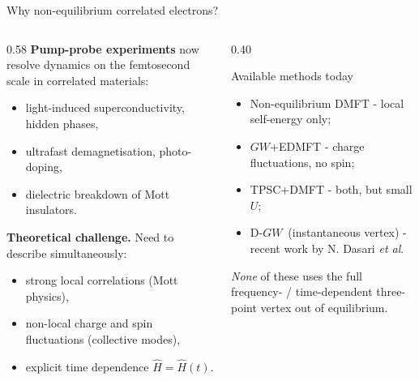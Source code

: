\documentclass[10pt,aspectratio=169]{beamer}
\newcommand{\dgw}{D\nobreakdash-$GW$}
\begin{document}
\begin{frame}{Why non-equilibrium correlated electrons?}
  \begin{columns}[T,onlytextwidth]
    \begin{column}{0.58\textwidth}
      \textbf{Pump-probe experiments} now resolve dynamics on the
      femtosecond scale in correlated materials:
      \begin{itemize}
        \item light-induced superconductivity, hidden phases,
        \item ultrafast demagnetisation, photo-doping,
        \item dielectric breakdown of Mott insulators.
      \end{itemize}

      \vspace{0.5em}
      \textbf{Theoretical challenge.} Need to describe simultaneously:
      \begin{itemize}
        \item strong local correlations (Mott physics),
        \item non-local charge and spin fluctuations (collective modes),
        \item explicit time dependence $\hat H = \hat H(t)$.
      \end{itemize}
    \end{column}
    \begin{column}{0.40\textwidth}
      \begin{block}{Available methods today}
        \footnotesize
        \begin{itemize}
          \item Non-equilibrium DMFT - local self-energy only;
          \item $GW$+EDMFT - charge fluctuations, no spin;
          \item TPSC+DMFT - both, but small $U$;
          \item \dgw\ (instantaneous vertex) - recent work by N. Dasari {\it et al}.
        \end{itemize}
      \end{block}
      \footnotesize
      \emph{None} of these uses the full frequency- / time-dependent
      three-point vertex out of equilibrium.
    \end{column}
  \end{columns}
\end{frame}
\end{document}
